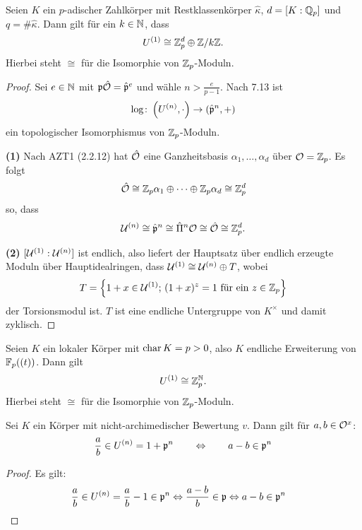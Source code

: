 

\begin{Prop}
	Seien $K$ ein $p$-adischer Zahlkörper mit Restklassenkörper $\hat{\kappa}$, $d =[K:\mathbb{Q}_p]$ und $q=\# \hat{\kappa}$. Dann gilt für ein $k\in \mathbb{N}$, dass
	\[ U^{(1)} \cong \mathbb{Z}_p^d \oplus \mathbb{Z} /k\mathbb{Z}.
	\]
	Hierbei steht $\cong$ für die Isomorphie von $\mathbb{Z}_p$-Moduln.
\end{Prop}


\begin{proof}
	Sei $e\in\mathbb{N}$ mit $\mathfrak{p} \hat{\mathcal{O}} = \hat{\mathfrak{p}}^e$ und wähle $n>\frac{e}{p-1}$.
	Nach 7.13 ist
	\[ \log \colon \left( U^{(n)} , \cdot \right) \to \left( \hat{\mathfrak{p}}^n, + \right)
	\]
	ein topologischer Isomorphismus von $\mathbb{Z}_p$-Moduln. 
	
	\bigskip \textbf{(1)} Nach AZT1 (2.2.12) hat $\hat{\mathcal{O}}$ eine Ganzheitsbasis $\alpha_1,\dots,\alpha_d$ über $\mathcal{O} = \mathbb{Z}_p$. Es folgt
	\[ \hat{\mathcal{O}} \cong \mathbb{Z}_p \alpha_1 \oplus \cdots \oplus \mathbb{Z}_p \alpha_d \cong \mathbb{Z}_p^d
	\]
	so, dass
	\[ \mathcal{U}^{(n)} \cong \hat{\mathfrak{p}}^n  \cong \hat{\Pi}^n \mathcal{O} \cong \hat{\mathcal{O}} \cong \mathbb{Z}_p^d.
	\]
	
	\bigskip \textbf{(2)} $[\mathcal{U}^{(1)}:\mathcal{U}^{(n)}]$ ist endlich, also liefert der Hauptsatz über endlich erzeugte Moduln über Hauptidealringen, dass $\mathcal{U}^{(1)} \cong \mathcal{U}^{(n)} \oplus T$, wobei
	\[ T = \left\{
	1+x \in \mathcal{U}^{(1)}; \, (1+x)^z = 1 \text{ für ein } z \in \mathbb{Z}_p
	\right\}
	\]
	der Torsionsmodul ist. $T$ ist eine endliche Untergruppe von $K^\times$ und damit zyklisch.
\end{proof}

\begin{Prop}
	Seien $K$ ein lokaler Körper mit $\operatorname{char} K = p>0$, also $K$ endliche Erweiterung von $\mathbb{F}_p((t))$.
	Dann gilt
	\[ U^{(1)} \cong \mathbb{Z}_p^{\mathbb{N}}.
	\]
	Hierbei steht $\cong$ für die Isomorphie von $\mathbb{Z}_p$-Moduln.
\end{Prop}

\begin{Vorüberlegung}
	Sei $K$ ein Körper mit nicht-archimedischer Bewertung $v$. Dann gilt für $a,b \in \mathcal{O}^x$:
	\[ \frac{a}{b} \in U^{(n)} = 1 +\mathfrak{p}^n \qquad \Leftrightarrow \qquad a-b \in \mathfrak{p}^n
	\]
\end{Vorüberlegung}

\begin{proof} Es gilt:
	\begin{align*}
	\frac{a}{b} \in U^{(n)}
	&= \frac{a}{b} - 1 \in \mathfrak{p}^n 
	\Leftrightarrow \frac{a-b}{b} \in\mathfrak{p}
	\Leftrightarrow a-b\in\mathfrak{p}^n
	\end{align*}
\end{proof}


